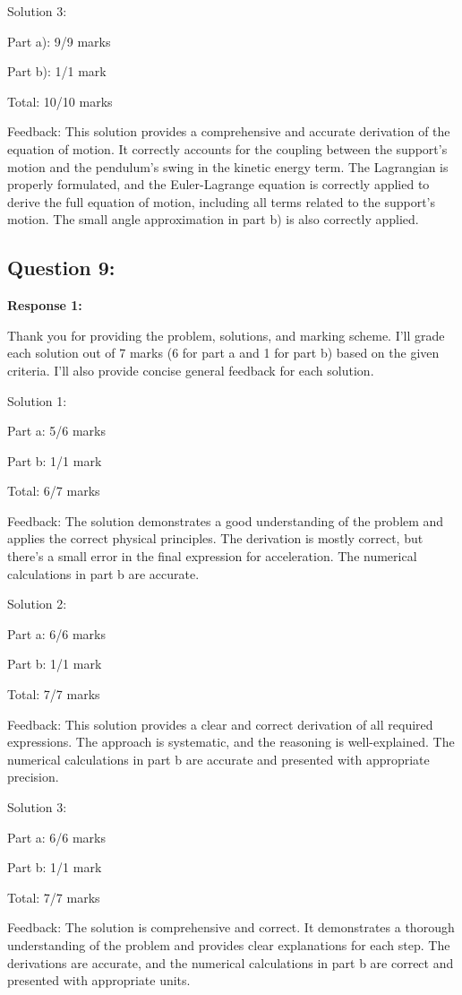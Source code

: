 \documentclass[a4paper,11pt]{article}
\begin{document}
Solution 3:

Part a): 9/9 marks

Part b): 1/1 mark

Total: 10/10 marks

Feedback: This solution provides a comprehensive and accurate derivation of the equation of motion. It correctly accounts for the coupling between the support's motion and the pendulum's swing in the kinetic energy term. The Lagrangian is properly formulated, and the Euler-Lagrange equation is correctly applied to derive the full equation of motion, including all terms related to the support's motion. The small angle approximation in part b) is also correctly applied.

\subsection*{Question 9:}

\textbf{Response 1:}

Thank you for providing the problem, solutions, and marking scheme. I'll grade each solution out of 7 marks (6 for part a and 1 for part b) based on the given criteria. I'll also provide concise general feedback for each solution.

Solution 1:

Part a: 5/6 marks

Part b: 1/1 mark

Total: 6/7 marks

Feedback: The solution demonstrates a good understanding of the problem and applies the correct physical principles. The derivation is mostly correct, but there's a small error in the final expression for acceleration. The numerical calculations in part b are accurate.

Solution 2:

Part a: 6/6 marks

Part b: 1/1 mark

Total: 7/7 marks

Feedback: This solution provides a clear and correct derivation of all required expressions. The approach is systematic, and the reasoning is well-explained. The numerical calculations in part b are accurate and presented with appropriate precision.

Solution 3:

Part a: 6/6 marks

Part b: 1/1 mark

Total: 7/7 marks

Feedback: The solution is comprehensive and correct. It demonstrates a thorough understanding of the problem and provides clear explanations for each step. The derivations are accurate, and the numerical calculations in part b are correct and presented with appropriate units.
\end{document}
